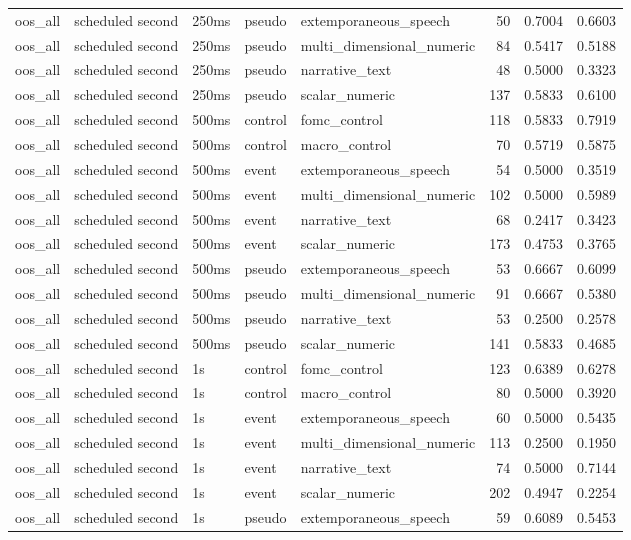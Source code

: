 \begin{tabular}{lllllrrr}
oos_all & scheduled second & 250ms & pseudo & extemporaneous_speech & 50 & 0.7004 & 0.6603 \\
oos_all & scheduled second & 250ms & pseudo & multi_dimensional_numeric & 84 & 0.5417 & 0.5188 \\
oos_all & scheduled second & 250ms & pseudo & narrative_text & 48 & 0.5000 & 0.3323 \\
oos_all & scheduled second & 250ms & pseudo & scalar_numeric & 137 & 0.5833 & 0.6100 \\
oos_all & scheduled second & 500ms & control & fomc_control & 118 & 0.5833 & 0.7919 \\
oos_all & scheduled second & 500ms & control & macro_control & 70 & 0.5719 & 0.5875 \\
oos_all & scheduled second & 500ms & event & extemporaneous_speech & 54 & 0.5000 & 0.3519 \\
oos_all & scheduled second & 500ms & event & multi_dimensional_numeric & 102 & 0.5000 & 0.5989 \\
oos_all & scheduled second & 500ms & event & narrative_text & 68 & 0.2417 & 0.3423 \\
oos_all & scheduled second & 500ms & event & scalar_numeric & 173 & 0.4753 & 0.3765 \\
oos_all & scheduled second & 500ms & pseudo & extemporaneous_speech & 53 & 0.6667 & 0.6099 \\
oos_all & scheduled second & 500ms & pseudo & multi_dimensional_numeric & 91 & 0.6667 & 0.5380 \\
oos_all & scheduled second & 500ms & pseudo & narrative_text & 53 & 0.2500 & 0.2578 \\
oos_all & scheduled second & 500ms & pseudo & scalar_numeric & 141 & 0.5833 & 0.4685 \\
oos_all & scheduled second & 1s & control & fomc_control & 123 & 0.6389 & 0.6278 \\
oos_all & scheduled second & 1s & control & macro_control & 80 & 0.5000 & 0.3920 \\
oos_all & scheduled second & 1s & event & extemporaneous_speech & 60 & 0.5000 & 0.5435 \\
oos_all & scheduled second & 1s & event & multi_dimensional_numeric & 113 & 0.2500 & 0.1950 \\
oos_all & scheduled second & 1s & event & narrative_text & 74 & 0.5000 & 0.7144 \\
oos_all & scheduled second & 1s & event & scalar_numeric & 202 & 0.4947 & 0.2254 \\
oos_all & scheduled second & 1s & pseudo & extemporaneous_speech & 59 & 0.6089 & 0.5453 \\

\end{tabular}
